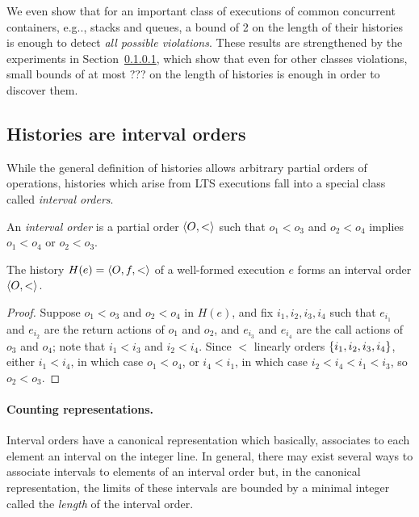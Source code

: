We even show that for an important class of executions of common concurrent containers, e.g.., stacks and queues, a
bound of 2 on the length of their histories is enough to detect \emph{all
possible violations}. These results are strengthened by the experiments in
Section~\ref{}, which show that even for other classes violations, small bounds
of at most ??? on the length of histories is enough in order to discover them.


\subsection{Histories are interval orders}

While the general definition of histories allows arbitrary partial orders of
operations, histories which arise from LTS executions fall into a special class
called \emph{interval orders}.

\begin{definition}

  An \emph{interval order} is a partial order $\left\langle {O,<} \right\rangle$ such that
  $o_1 < o_3$ and $o_2 < o_4$ implies $o_1 < o_4$ or $o_2 < o_3$.

\end{definition}

\begin{lemma}
  \label{lem:intervals}

  The history $H(e) = \left\langle {O,f,<} \right\rangle$ of a well-formed execution $e$ forms an
  interval order $\left\langle {O,<} \right\rangle$.

\end{lemma}

\begin{proof}

  Suppose $o_1 < o_3$ and $o_2 < o_4$ in $H(e)$, and fix $i_1, i_2, i_3, i_4$
  such that $e_{i_1}$ and $e_{i_2}$ are the return actions of $o_1$ and $o_2$,
  and $e_{i_3}$ and $e_{i_4}$ are the call actions of $o_3$ and $o_4$; note
  that $i_1 < i_3$ and $i_2 < i_4$. Since $<$ linearly orders ${\{ i_1, i_2,
  i_3, i_4 \}}$, either $i_1 < i_4$, in which case $o_1 < o_4$, or $i_4 < i_1$, in
  which case $i_2 < i_4 < i_1 < i_3$, so $o_2 < o_3$.

\end{proof}

\paragraph{Counting representations.}
Interval orders have a canonical representation which basically, associates to
each element an interval on the integer line. In general, there may exist
several ways to associate intervals to elements of an interval order but, in
the canonical representation, the limits of these intervals are bounded by a minimal 
integer called the \emph{length} of the interval order.


